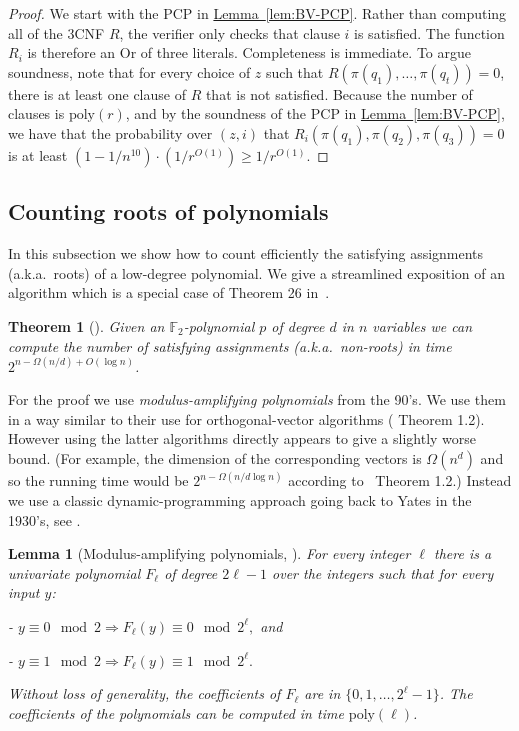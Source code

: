 \documentclass[11pt]{article}
\newcommand{\expref}[2]{\texorpdfstring{\hyperref[#2]{#1~\ref{#2}}}{#1~\ref{#2}}}
\newtheorem{thm}[theorem]{Theorem}
\newtheorem{lem}[theorem]{Lemma}  %
\newcommand{\F}{\mathbb{F}}
\newcommand{\poly}{\mathrm{poly}}
\begin{document}
\begin{proof}
We start with the PCP in \expref{Lemma}{lem:BV-PCP}. Rather than computing
all of the 3CNF $R$, the verifier only checks that clause $i$ is
satisfied. The function $R_{i}$ is therefore an Or of three literals.
Completeness is immediate. To argue soundness, note that for every
choice of $z$ such that $R(\pi(q_{1}),\ldots,\pi(q_{t}))=0$, there
is at least one clause of $R$ that is not satisfied. Because the
number of clauses is $\poly(r)$, and by the soundness of the PCP
in \expref{Lemma}{lem:BV-PCP}, we have that the probability over $(z,i)$
that $R_{i}(\pi(q_{1}),\pi(q_{2}),\pi(q_{3}))=0$ is at least $(1-1/n^{10})\cdot(1/r^{O(1)})\ge1/r^{O(1)}$.
\end{proof}

\subsection{Counting roots of polynomials\label{subsec:=000023SAT-poly}}

In this subsection we show how to count efficiently the satisfying
assignments (a.k.a.~roots) of a low-degree polynomial. We give a
streamlined exposition of an algorithm which is a special case of
Theorem 26 in~\cite{DBLP:conf/coco/Williams18}.
\begin{thm}[{\cite[Theorem 26]{DBLP:conf/coco/Williams18}}]
\label{thm:=000023SAT-poly}
Given an $\F_{2}$-polynomial $p$ of degree $d$ in $n$ variables
we can compute the number of satisfying assignments (a.k.a.~non-roots)
in time $2^{n-\Omega(n/d)+O(\log n)}$.
\end{thm}

For the proof we use \emph{modulus-amplifying polynomials} from the
90's. We use them in a way similar to their use for orthogonal-vector
algorithms (\cite{DBLP:conf/soda/ChanW16} Theorem 1.2). However using
the latter algorithms directly appears to give a slightly worse bound.
(For example, the dimension of the corresponding vectors is $\Omega(n^{d})$
and so the running time would be $2^{n-\Omega(n/d\log n)}$ according
to~\cite{DBLP:conf/soda/ChanW16} Theorem 1.2.) Instead we use a classic
dynamic-programming approach going back to Yates in the %
1930's,  %
see \cite{Williams14-acc-jacm}.
\begin{lem}[{Modulus-amplifying polynomials, \cite{Yao90,BeT94}}] \label{lem:=00005BModulus-amplifying-polynomials=00005D}
For every integer $\ell$ there is a univariate polynomial $F_{\ell}$
of degree $2\ell-1$ over the integers such that for every input $y$:

- $y\equiv0\mod2\Rightarrow F_{\ell}(y)\equiv0\mod2^{\ell},$ and

- $y\equiv1\mod2\Rightarrow F_{\ell}(y)\equiv1\mod2^{\ell}.$

Without loss of generality, the coefficients of $F_{\ell}$ are in
$\{0,1,\ldots,2^{\ell}-1\}$. The coefficients of the polynomials
can be computed in time $\poly(\ell)$.
\end{lem}
\end{document}
